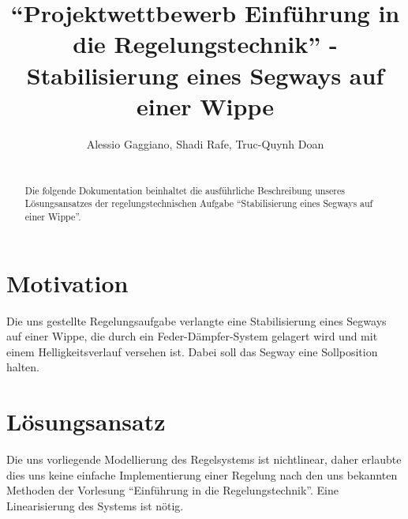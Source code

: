 \documentclass[pdf]{ifacconf}
\begin{document}
\begin{frontmatter}

\title{``Projektwettbewerb Einführung in die Regelungstechnik'' - Stabilisierung eines
Segways auf einer
Wippe}


\author{Alessio Gaggiano, Shadi Rafe, Truc-Quynh Doan} 

\begin{abstract}\\                          %
Die folgende Dokumentation beinhaltet die ausführliche Beschreibung unseres Lösungsansatzes der regelungstechnischen Aufgabe ``Stabilisierung eines Segways auf einer Wippe''. 
\end{abstract}

\end{frontmatter}

\section{Motivation}
Die uns gestellte Regelungsaufgabe verlangte eine Stabilisierung eines Segways auf einer Wippe, die durch ein Feder-Dämpfer-System gelagert wird und mit einem Helligkeitsverlauf versehen ist. Dabei soll das Segway eine Sollposition halten. 


\section{Lösungsansatz}
Die uns vorliegende Modellierung des Regelsystems ist nichtlinear, daher erlaubte dies uns keine einfache Implementierung einer Regelung nach den uns bekannten Methoden der Vorlesung ``Einführung in die Regelungstechnik''. Eine Linearisierung des Systems ist nötig.
\end{document}

